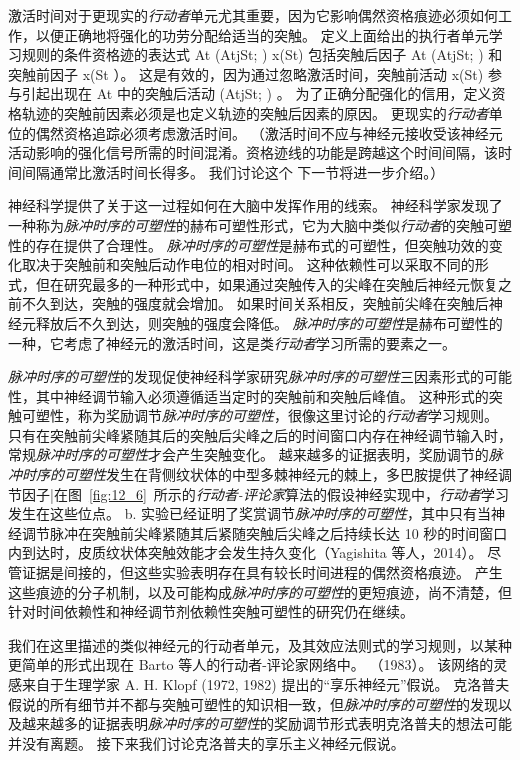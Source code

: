 激活时间对于更现实的\textit{行动者}单元尤其重要，因为它影响偶然资格痕迹必须如何工作，以便正确地将强化的功劳分配给适当的突触。 定义上面给出的执行者单元学习规则的条件资格迹的表达式 At (AtjSt; ) x(St) 包括突触后因子 At (AtjSt; ) 和突触前因子 x(St ）。
这是有效的，因为通过忽略激活时间，突触前活动 x(St) 参与引起出现在 At 中的突触后活动 (AtjSt; ) 。
为了正确分配强化的信用，定义资格轨迹的突触前因素必须是也定义轨迹的突触后因素的原因。
更现实的\textit{行动者}单位的偶然资格追踪必须考虑激活时间。
（激活时间不应与神经元接收受该神经元活动影响的强化信号所需的时间混淆。资格迹线的功能是跨越这个时间间隔，该时间间隔通常比激活时间长得多。
我们讨论这个 下一节将进一步介绍。）


神经科学提供了关于这一过程如何在大脑中发挥作用的线索。
神经科学家发现了一种称为\textit{脉冲时序的可塑性}的赫布可塑性形式，它为大脑中类似\textit{行动者}的突触可塑性的存在提供了合理性。
\textit{脉冲时序的可塑性}是赫布式的可塑性，但突触功效的变化取决于突触前和突触后动作电位的相对时间。
这种依赖性可以采取不同的形式，但在研究最多的一种形式中，如果通过突触传入的尖峰在突触后神经元恢复之前不久到达，突触的强度就会增加。
如果时间关系相反，突触前尖峰在突触后神经元释放后不久到达，则突触的强度会降低。
\textit{脉冲时序的可塑性}是赫布可塑性的一种，它考虑了神经元的激活时间，这是类\textit{行动者}学习所需的要素之一。


\textit{脉冲时序的可塑性}的发现促使神经科学家研究\textit{脉冲时序的可塑性}三因素形式的可能性，其中神经调节输入必须遵循适当定时的突触前和突触后峰值。
这种形式的突触可塑性，称为奖励调节\textit{脉冲时序的可塑性}，很像这里讨论的\textit{行动者}学习规则。
只有在突触前尖峰紧随其后的突触后尖峰之后的时间窗口内存在神经调节输入时，常规\textit{脉冲时序的可塑性}才会产生突触变化。
越来越多的证据表明，奖励调节的\textit{脉冲时序的可塑性}发生在背侧纹状体的中型多棘神经元的棘上，多巴胺提供了神经调节因子|在图~\ref{fig:12_6}~所示的\textit{行动者-评论家}算法的假设神经实现中，\textit{行动者}学习发生在这些位点。
b. 实验已经证明了奖赏调节\textit{脉冲时序的可塑性}，其中只有当神经调节脉冲在突触前尖峰紧随其后紧随突触后尖峰之后持续长达 10 秒的时间窗口内到达时，皮质纹状体突触效能才会发生持久变化（Yagishita 等人，2014）。
尽管证据是间接的，但这些实验表明存在具有较长时间进程的偶然资格痕迹。
产生这些痕迹的分子机制，以及可能构成\textit{脉冲时序的可塑性}的更短痕迹，尚不清楚，但针对时间依赖性和神经调节剂依赖性突触可塑性的研究仍在继续。


我们在这里描述的类似神经元的行动者单元，及其效应法则式的学习规则，以某种更简单的形式出现在 Barto 等人的行动者-评论家网络中。 （1983）。
该网络的灵感来自于生理学家 A. H. Klopf (1972, 1982) 提出的“享乐神经元”假说。
克洛普夫假说的所有细节并不都与突触可塑性的知识相一致，但\textit{脉冲时序的可塑性}的发现以及越来越多的证据表明\textit{脉冲时序的可塑性}的奖励调节形式表明克洛普夫的想法可能并没有离题。
接下来我们讨论克洛普夫的享乐主义神经元假说。



